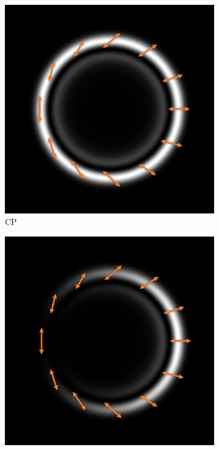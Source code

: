 \documentclass[11pt, a4paper, twoside]{article} %
\begin{document}
\begin{figure}[h!] 
     \centering 
    \begin{subfigure}[b]{0.245\linewidth}
    \includegraphics[width=\linewidth]{simul21.PNG}
    \caption{CP }
     \end{subfigure}
 \begin{subfigure}[b]{0.245\linewidth}
     \includegraphics[width=\linewidth]{simul23.PNG}

\end{subfigure}
\end{figure}
\end{document}

